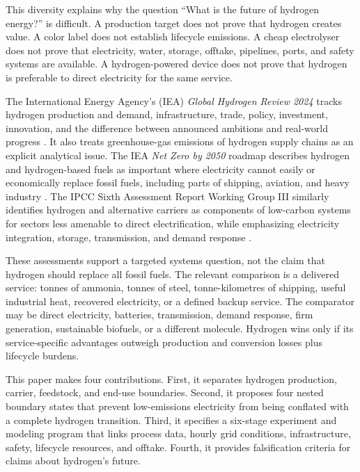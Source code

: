 \documentclass[conference]{IEEEtran}
\begin{document}
This diversity explains why the question ``What is the future of hydrogen energy?'' is difficult. A production target does not prove that hydrogen creates value. A color label does not establish lifecycle emissions. A cheap electrolyser does not prove that electricity, water, storage, offtake, pipelines, ports, and safety systems are available. A hydrogen-powered device does not prove that hydrogen is preferable to direct electricity for the same service.

The International Energy Agency's (IEA) \emph{Global Hydrogen Review 2024} tracks hydrogen production and demand, infrastructure, trade, policy, investment, innovation, and the difference between announced ambitions and real-world progress \cite{iea_review}. It also treats greenhouse-gas emissions of hydrogen supply chains as an explicit analytical issue. The IEA \emph{Net Zero by 2050} roadmap describes hydrogen and hydrogen-based fuels as important where electricity cannot easily or economically replace fossil fuels, including parts of shipping, aviation, and heavy industry \cite{iea_nz}. The IPCC Sixth Assessment Report Working Group III similarly identifies hydrogen and alternative carriers as components of low-carbon systems for sectors less amenable to direct electrification, while emphasizing electricity integration, storage, transmission, and demand response \cite{ipcc_wg3}.

These assessments support a targeted systems question, not the claim that hydrogen should replace all fossil fuels. The relevant comparison is a delivered service: tonnes of ammonia, tonnes of steel, tonne-kilometres of shipping, useful industrial heat, recovered electricity, or a defined backup service. The comparator may be direct electricity, batteries, transmission, demand response, firm generation, sustainable biofuels, or a different molecule. Hydrogen wins only if its service-specific advantages outweigh production and conversion losses plus lifecycle burdens.

This paper makes four contributions. First, it separates hydrogen production, carrier, feedstock, and end-use boundaries. Second, it proposes four nested boundary states that prevent low-emissions electricity from being conflated with a complete hydrogen transition. Third, it specifies a six-stage experiment and modeling program that links process data, hourly grid conditions, infrastructure, safety, lifecycle resources, and offtake. Fourth, it provides falsification criteria for claims about hydrogen's future.
\end{document}
